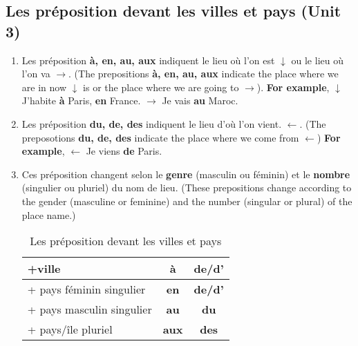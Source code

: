 \documentclass[10pt,a4paper,twoside]{article} %
\begin{document}
\subsection*{Les préposition devant les villes et pays (Unit 3)}
\begin{enumerate}
    \item Les préposition \textbf{à, en, au, aux} indiquent le lieu où l'on est $\downarrow$ ou le lieu où l'on va $\rightarrow$. (The prepositions \textbf{à, en, au, aux} indicate the place where we are in now $\downarrow$ is or the place where we are going to $\rightarrow$). \newline
    \textbf{For example}, \newline
    $\downarrow$ J'habite \textbf{à} Paris, \textbf{en} France. \newline
    $\rightarrow$ Je vais \textbf{au} Maroc.
    \item Les préposition \textbf{du, de, des} indiquent le lieu d'où l'on vient. $\leftarrow$. (The preposotions \textbf{du, de, des} indicate the place where we come from $\leftarrow$) \newline
    \textbf{For example}, \newline
    $\leftarrow$ Je viens \textbf{de} Paris.
    \item Ces préposition changent selon le \textbf{genre} (masculin ou féminin) et le \textbf{nombre} (singulier ou pluriel) du nom de lieu. (These prepositions change according to the gender (masculine or feminine) and the number (singular or plural) of the place name.)
    \begin{table}[h]
    \centering
    \begin{tabular}{|l|c|c|}
    \hline
    +ville                    & \textbf{à}   & \textbf{de/d'} \\ \hline
    + pays féminin singulier  & \textbf{en}  & \textbf{de/d'} \\ \hline
    + pays masculin singulier & \textbf{au}  & \textbf{du}    \\ \hline
    + pays/île pluriel        & \textbf{aux} & \textbf{des}   \\ \hline
    \end{tabular}
    \caption{Les préposition devant les villes et pays}
    \label{tab:les-prepositions-devant-les-villes-et-pays}
    \end{table}
    \\
\end{enumerate}
\end{document}
